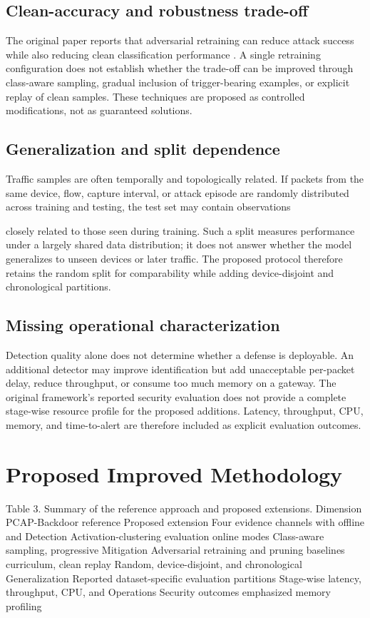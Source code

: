 \documentclass[11pt]{article}
\begin{document}
\subsection{Clean-accuracy and robustness trade-off}
The original paper reports that adversarial retraining can reduce attack success while also reducing clean classification performance \cite{ref1}. A single retraining configuration does not establish whether the trade-off can be improved through class-aware sampling, gradual inclusion of trigger-bearing examples, or explicit replay of clean samples. These techniques are proposed as controlled modifications, not as guaranteed solutions.

\subsection{Generalization and split dependence}
Traffic samples are often temporally and topologically related. If packets from the same device, flow, capture interval, or attack episode are randomly distributed across training and testing, the test set may contain observations

closely related to those seen during training. Such a split measures performance under a largely shared data distribution; it does not answer whether the model generalizes to unseen devices or later traffic. The proposed protocol therefore retains the random split for comparability while adding device-disjoint and chronological partitions.

\subsection{Missing operational characterization}
Detection quality alone does not determine whether a defense is deployable. An additional detector may improve identification but add unacceptable per-packet delay, reduce throughput, or consume too much memory on a gateway. The original framework's reported security evaluation does not provide a complete stage-wise resource profile for the proposed additions. Latency, throughput, CPU, memory, and time-to-alert are therefore included as explicit evaluation outcomes.

\section{Proposed Improved Methodology}
Table 3. Summary of the reference approach and proposed extensions. Dimension                                     PCAP-Backdoor reference                        Proposed extension Four evidence channels with offline and Detection                                     Activation-clustering evaluation online modes Class-aware sampling, progressive Mitigation                                    Adversarial retraining and pruning baselines curriculum, clean replay Random, device-disjoint, and chronological Generalization                                Reported dataset-specific evaluation partitions Stage-wise latency, throughput, CPU, and Operations                                    Security outcomes emphasized memory profiling
\end{document}
